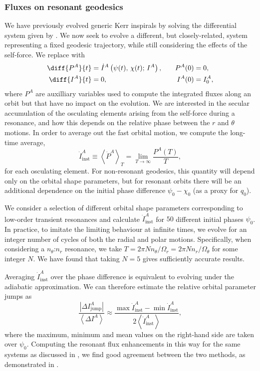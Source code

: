 \subsubsection{Fluxes on resonant geodesics}
\label{sec:res-geo-fluxes}
We have previously evolved generic Kerr inspirals by solving the differential system given by . We now seek to evolve a different, but closely-related, system representing a fixed geodesic trajectory, while still considering the effects of the self-force. We replace  with
\begin{subequations}
\begin{align}
\diff{P^A}{t} &= \dot{I}^A\left(\psi(t),\,\chi(t);\,I^A\right),\quad &P^A(0) &= 0,\\
\diff{I^A}{t} &= 0,\quad &I^A(0) &= I^A_0,
\end{align}
\end{subequations}
where $P^A$ are auxilliary variables used to compute the integrated fluxes along an orbit but that have no impact on the evolution. We are interested in the secular accumulation of the osculating elements arising from the self-force during a resonance, and how this depends on the relative phase between the $r$ and $\theta$ motions. In order to average out the fast orbital motion, we compute the long-time average,
\begin{equation}
\label{eq:res-geo-flux-diff}
\dot{I}^A_\mathrm{inst} \equiv \left\langle \dot{P}^A \right\rangle_T = \lim_{T\rightarrow\infty} \frac{P^A(T)}{T},
\end{equation}
for each osculating element. For non-resonant geodesics, this quantity will depend only on the orbital shape parameters, but for resonant orbits there will be an additional dependence on the initial phase difference $\psi_0 - \chi_0$ (as a proxy for $q_0$).

We consider a selection of different orbital shape parameters corresponding to low-order transient resonances and calculate $\dot{I}^A_\mathrm{inst}$ for $50$ different initial phases $\psi_0$. In practice, to imitate the limiting behaviour at infinite times, we evolve for an integer number of cycles of both the radial and polar motions. Specifically, when considering a $n_\theta$:$n_r$ resonance, we take $T = 2\pi N n_\theta/\Omega_r = 2\pi N n_r/\Omega_\theta$ for some integer $N$. We have found that taking $N=5$ gives sufficiently accurate results.

Averaging $\dot{I}^A_\mathrm{inst}$ over the phase difference is equivalent to evolving under the adiabatic approximation. We can therefore estimate the relative orbital parameter jumps as
\begin{equation}
\label{eq:res-flux-enhnc}
\frac{|\Delta I^A_\mathrm{jump}|}{\left\langle\Delta I^A\right\rangle} \approx \frac{\max \dot{I}^A_\mathrm{inst} - \min \dot{I}^A_\mathrm{inst} }{2 \left\langle \dot{I}^A_\mathrm{inst} \right\rangle},
\end{equation}
where the maximum, minimum and mean values on the right-hand side are taken over $\psi_0$. Computing the resonant flux enhancements in this way for the same systems as discussed in , we find good agreement between the two methods, as demonstrated in .

